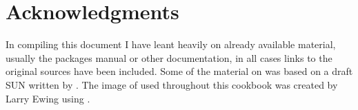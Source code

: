 \documentclass[twoside,11pt]{starlink}
\begin{document}
\section*{Acknowledgments\label{sc15_acks}}

In compiling this document I have leant heavily on already available
material, usually the packages manual or other documentation, in all
cases links to the original sources have been included. Some of the
material on  was based on a draft SUN written
by .
The image of  used
throughout this cookbook was created by Larry Ewing
 using .
\end{document}
